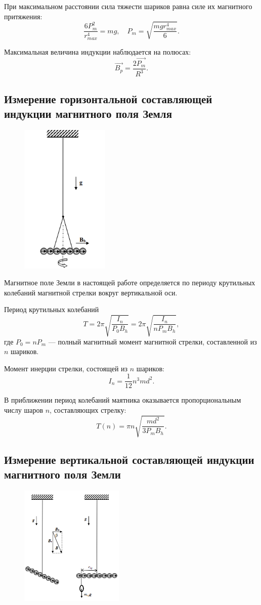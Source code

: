 \documentclass[a4paper]{article}
\theoremstyle{definition}
\theoremstyle{remark}
\begin{document}
При максимальном расстоянии сила тяжести шариков равна силе их магнитного притяжения: $$\frac{6P_m^2}{r_{max}^4} = mg, \quad P_m = \sqrt{ \frac{mgr^4_{max}}{6} }.$$ 

Максимальная величина индукции наблюдается на полюсах: $$\vec{B_p} = \frac{2\vec{P_m}}{R^3}.$$

\subsection{Измерение горизонтальной составляющей индукции магнитного поля Земля}

\begin{figure}
    \centering
    \includegraphics[width = 120pt]{image/pic2.png}
\end{figure}

Магнитное поле Земли в настоящей работе определяется по периоду крутильных колебаний магнитной стрелки вокруг вертикальной оси.

Период крутильных колебаний $$T = 2\pi\sqrt{ \frac{I_n}{P_0B_h} } = 2\pi\sqrt{ \frac{I_n}{nP_mB_h} },$$ где $P_0 = nP_m$ --- полный магнитный момент магнитной стрелки, составленной из $n$ шариков. 

Момент инерции стрелки, состоящей из $n$ шариков: $$I_n = \frac{1}{12}n^3md^2.$$ 

В приближении период колебаний маятника оказывается пропорциональным числу шаров $n$, составляющих стрелку: $$T(n) = \pi n\sqrt{ \frac{md^2}{3P_mB_h} }.$$

\subsection{Измерение вертикальной составляющей индукции магнитного поля Земли}

\begin{figure}
    \centering
    \includegraphics[width = 140pt]{image/pic3.png}
\end{figure}
\end{document}
